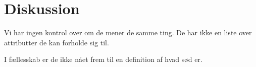 \section*{Diskussion}
\label{Diskussion}
%
Vi har ingen kontrol over om de mener de samme ting. De har ikke en liste over attributter de kan forholde sig til. 

I fællesskab er de ikke nået frem til en definition af hvad sød er.